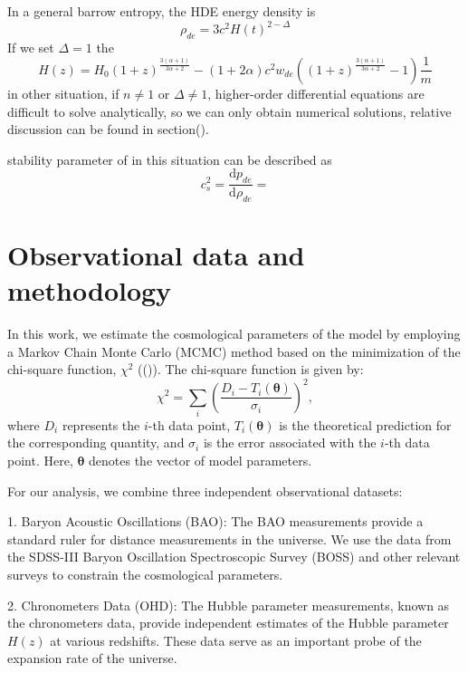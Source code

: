 \documentclass[manuscript]{aastex631}
\begin{document}
In a general barrow entropy, the HDE energy density is
\begin{equation}
    \rho_{de}=3c^2 H(t)^{2-\Delta}
\end{equation}
If we set $\Delta=1$ the 
\begin{equation}
    H(z)= H_0 (1+z)^{\frac{3 (\alpha +1)}{3\alpha +2}}-(1+2 \alpha) c^2 w_{de} \left((1+z)^{\frac{3 (\alpha +1)}{3\alpha +2}}-1\right)\frac{1}{m}
\end{equation}
in other situation, if $n \neq 1$ or $\Delta \neq 1$, higher-order differential equations are difficult to solve analytically, so we can only obtain numerical solutions, relative discussion can be found in section().


stability parameter of in this situation can be described as
\begin{equation}
    c_s^2=\frac{\text{d} p_{de}}{\text{d} \rho_{de}}=
\end{equation}


\section{Observational data and methodology}

In this work, we estimate the cosmological parameters of the model by employing a Markov Chain Monte Carlo (MCMC) method based on the minimization of the chi-square function, \(\chi^2\) ((\cite{Padilla_2021})). The chi-square function is given by:
\begin{equation}
\chi^2 = \sum_i \left(\frac{D_i - T_i(\mathbf{\theta})}{\sigma_i}\right)^2,
\end{equation}
where \(D_i\) represents the \(i\)-th data point, \(T_i(\mathbf{\theta})\) is the theoretical prediction for the corresponding quantity, and \(\sigma_i\) is the error associated with the \(i\)-th data point. Here, \(\mathbf{\theta}\) denotes the vector of model parameters.

For our analysis, we combine three independent observational datasets:

1. Baryon Acoustic Oscillations (BAO): The BAO measurements provide a standard ruler for distance measurements in the universe. We use the data from the SDSS-III Baryon Oscillation Spectroscopic Survey (BOSS) and other relevant surveys to constrain the cosmological parameters.

2. Chronometers Data (OHD): The Hubble parameter measurements, known as the chronometers data, provide independent estimates of the Hubble parameter \(H(z)\) at various redshifts. These data serve as an important probe of the expansion rate of the universe.
\end{document}
